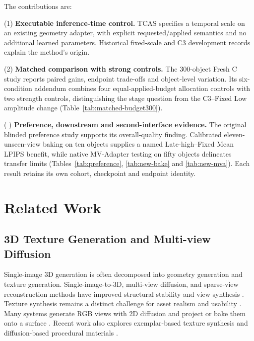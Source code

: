 \documentclass[times,twocolumn,final]{elsarticle}
\providecommand{\DIFadd}[1]{{\protect\color{blue} \sf #1}} %
\providecommand{\DIFaddbegin}{} %
\providecommand{\DIFaddend}{} %
\begin{document}
The   \DIFaddbegin \DIFadd{contributions are}\DIFaddend :

(1)   \DIFaddbegin \DIFadd{\textbf{Executable inference-time control.} TCAS specifies a temporal scale on an existing geometry adapter, with explicit requested/applied semantics and no additional learned parameters. Historical fixed-scale and C3 development records explain the method's origin}\DIFaddend .

(2)  
 \DIFaddbegin \DIFadd{\textbf{Matched comparison with strong controls.} The }\DIFaddend 300-object   \DIFaddbegin \DIFadd{Fresh C study reports paired gains, endpoint trade-offs and object-level variation. Its six-condition addendum combines four equal-applied-budget allocation controls with two strength controls, distinguishing the stage question from the C3--Fixed Low amplitude change (Table~\ref{tab:matched-budget300})}\DIFaddend .

(  \DIFaddbegin \DIFadd{3) \textbf{Preference, downstream and second-interface evidence.} The original blinded preference study supports its overall-quality finding. Calibrated eleven-unseen-view baking on ten objects supplies a named Late-high--Fixed Mean LPIPS benefit, while native MV-Adapter testing on fifty objects delineates transfer limits (Tables~\ref{tab:preference}, \ref{tab:new-bake} and \ref{tab:new-mva}). Each result retains its own cohort, checkpoint and endpoint identity}\DIFaddend .

\section{Related Work}
\label{sec:related}

\subsection{3D Texture Generation and Multi-view Diffusion}
\label{subsec:3dtex}

Single-image 3D generation is often decomposed into geometry generation and texture generation.   \DIFaddbegin \DIFadd{Single-image-to-3D}\DIFaddend , multi-view diffusion, and sparse-view reconstruction methods have   \DIFaddbegin \DIFadd{improved structural stability and view synthesis \cite{liu2023zero1to3,shi2023zero123pp,liu2023syncdreamer,long2023wonder3d,shi2024mvdream,wang2023imagedream,xu2024instantmesh,ke2024era3d}. Texture synthesis remains a distinct challenge for asset }\DIFaddend realism and usability   \DIFaddbegin \DIFadd{\cite{perla2026survey}. Many systems generate RGB views with }\DIFaddend 2D   \DIFaddbegin \DIFadd{diffusion and }\DIFaddend project or bake   \DIFaddbegin \DIFadd{them onto a }\DIFaddend surface \cite{chen2023text2tex,richardson2023texture,poole2023dreamfusion,chen2023fantasia3d}.   \DIFaddbegin \DIFadd{Recent work also explores }\DIFaddend exemplar-based texture synthesis   \DIFaddbegin \DIFadd{and }\DIFaddend diffusion-based procedural   \DIFaddbegin \DIFadd{materials \cite{guzman2026adaptive,lv2025interpretable}}\DIFaddend .
\end{document}
